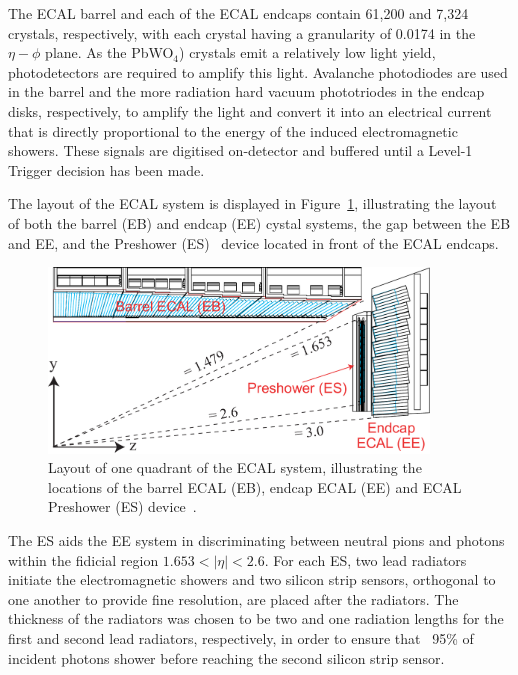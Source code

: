 The ECAL barrel and each of the ECAL endcaps contain 61,200 and 7,324 crystals, respectively, with each crystal having a granularity of 0.0174 in the $\eta - \phi$ plane.
As the PbWO$_{4}$) crystals emit a relatively low light yield, photodetectors are required to amplify this light.
Avalanche photodiodes are used in the barrel and the more radiation hard vacuum phototriodes in the endcap disks, respectively, to amplify the light and convert it into an electrical current that is directly proportional to the energy of the induced electromagnetic showers.
These signals are digitised on-detector and buffered until a Level-1 Trigger decision has been made.

The layout of the ECAL system is displayed in Figure~\ref{fig:ecal}, illustrating the layout of both the barrel (EB) and endcap (EE) cystal systems, the gap between the EB and EE, and the Preshower (ES)~\cite{Loos:539819} device located in front of the ECAL endcaps.

\begin{figure}[htb]
\begin{center}
\includegraphics[width=0.9\textwidth]{figs/cms/ECAL_Transverse_section.pdf}
\caption{Layout of one quadrant of the ECAL system, illustrating the locations of the barrel ECAL (EB), endcap ECAL (EE) and ECAL Preshower (ES) device~\cite{Bayatian:2006nff}.}
\label{fig:ecal}
\end{center}
\end{figure}

The ES aids the EE system in discriminating between neutral pions and photons within the fidicial region $1.653 < |\eta| < 2.6$.
For each ES, two lead radiators initiate the electromagnetic showers and two silicon strip sensors, orthogonal to one another to provide fine resolution, are placed after the radiators.
The thickness of the radiators was chosen to be two and one radiation lengths for the first and second lead radiators, respectively, in order to ensure that ~95\% of incident photons shower before reaching the second silicon strip sensor.

